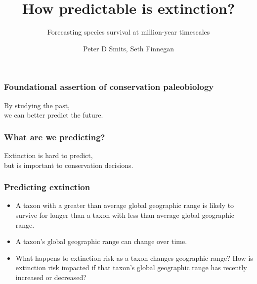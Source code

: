\documentclass[aspectratio=169]{beamer}
\title{How predictable is extinction?}
\subtitle{Forecasting species survival at million-year timescales}
\author{Peter D Smits, Seth Finnegan}
\institute{Department of Integrative Biology, University of California -- Berkeley}
\date{}
\begin{document}
\begin{frame}
  \maketitle
\end{frame}


\begin{frame}
  \frametitle{Foundational assertion of conservation paleobiology }

  \begin{center}
    \begin{LARGE}
      By studying the \alert{past}, \\we can better predict the \alert{future}.
    \end{LARGE}
  \end{center}

\end{frame}


\begin{frame}
  \frametitle{What are we predicting?}

  \begin{center}
    \begin{LARGE}
      Extinction is \alert{hard} to predict, \\but is \alert{important} to conservation decisions.
    \end{LARGE}
  \end{center}

\end{frame}


\begin{frame}
  \frametitle{Predicting extinction}

  \begin{Large}
    \begin{itemize}[<+->]
      \item A taxon with a \alert{greater than average} global geographic range is likely to \alert{survive for longer} than a taxon with \alert{less than average} global geographic range.
      \item A taxon's global geographic range can change over time.
      \item What happens to extinction risk as a taxon changes geographic range? How is extinction risk impacted if that taxon's global geographic range has recently \alert{increased} or \alert{decreased}?
    \end{itemize}
  \end{Large}

\end{frame}
\end{document}
